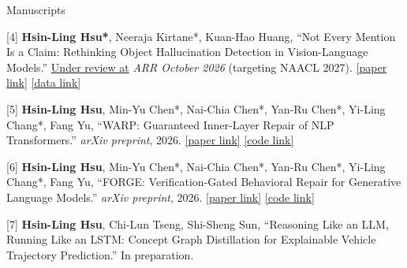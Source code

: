 \documentclass{resume} %
\newcommand{\lnk}[2]{\href{#1}{\textcolor{linkblue}{[#2]}}} %
\begin{document}

\begin{rSection}{Manuscripts}

[4] \textbf{Hsin-Ling Hsu*}, Neeraja Kirtane*, Kuan-Hao Huang, ``Not Every Mention Is a Claim: Rethinking Object Hallucination Detection in Vision-Language Models.''
\underline{Under review at} \textit{ARR October 2026} (targeting NAACL 2027). \hspace{0.1cm}\lnk{https://arxiv.org/pdf/2610.23610}{paper link} \hspace{0.1cm}\lnk{https://github.com/lab-flair/NAME_Bench}{data link}

[5] \textbf{Hsin-Ling Hsu}, Min-Yu Chen*, Nai-Chia Chen*, Yan-Ru Chen*, Yi-Ling Chang*, Fang Yu, ``WARP: Guaranteed Inner-Layer Repair of NLP Transformers.''
\textit{arXiv preprint}, 2026. \hspace{0.1cm}\lnk{https://arxiv.org/pdf/2604.00938}{paper link}
\hspace{0.1cm}\lnk{https://github.com/sostrustfix/WARP}{code link}

[6] \textbf{Hsin-Ling Hsu}, Min-Yu Chen*, Nai-Chia Chen*, Yan-Ru Chen*, Yi-Ling Chang*, Fang Yu, ``FORGE: Verification-Gated Behavioral Repair for Generative Language Models.''
\textit{arXiv preprint}, 2026. \hspace{0.1cm}\lnk{https://arxiv.org/pdf/2610.05190}{paper link}
\hspace{0.1cm}\lnk{https://github.com/sostrustfix/FORGE}{code link}

[7] \textbf{Hsin-Ling Hsu}, Chi-Lun Tseng, Shi-Sheng Sun, ``Reasoning Like an LLM, Running Like an LSTM: Concept Graph Distillation for Explainable Vehicle Trajectory Prediction.''
In preparation.


\end{rSection}

\end{document}
